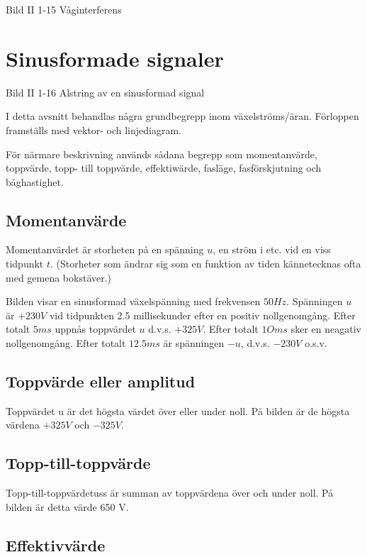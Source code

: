 Bild II 1-15 Våginterferens

\cleardoublepage

\section{Sinusformade signaler}

Bild II 1-16 Alstring av en sinusformad signal

I detta avsnitt behandlas några grundbegrepp inom växelströms/äran. Förloppen
framställs med vektor- och linjediagram.

För närmare beskrivning används sådana begrepp som momentanvärde, toppvärde, topp- till
toppvärde, effektiwärde, fasläge, fasförskjutning och båghastighet.

\subsection{Momentanvärde}

Momentanvärdet är storheten på en spänning $u$, en ström i etc. vid en viss tidpunkt $t$.
(Storheter som ändrar sig som en funktion av tiden kännetecknas ofta med gemena bokstäver.)

Bilden visar en sinusformad växelspänning med frekvensen $50 Hz$. Spänningen $u$ är $+230 V$ vid tidpunkten 2.5 millisekunder efter en positiv nollgenomgång. Efter totalt $5 ms$
uppnås toppvärdet $u$ d.v.s. $+325 V$. Efter totalt $1O ms$ sker en neagativ
nollgenomgång. Efter totalt $12.5 ms$ är spänningen $-u$, d.v.s. $-230 V$ o.s.v.

\subsection{Toppvärde eller amplitud}

Toppvärdet u är det högsta värdet över eller under noll. På bilden är de högsta
värdena $+325 V$ och $-325 V$.

\subsection{Topp-till-toppvärde}

Topp-till-toppvärdetuss är summan av toppvärdena över och under noll. På bilden är
detta värde 650 V.

\subsection{Effektivvärde}


